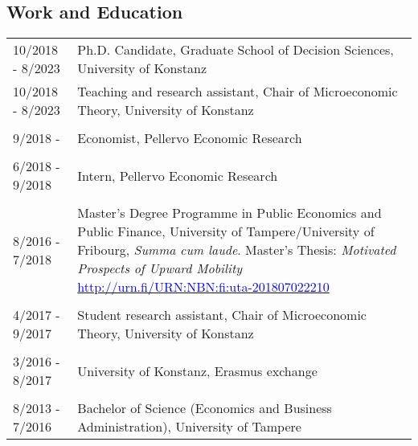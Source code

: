 \documentclass[16pt]{article}
\begin{document}
\subsection*{Work and Education}
\begin{tabular}{@{}p{1.5in}p{5in}}
10/2018 - 8/2023   & Ph.D. Candidate, Graduate School of Decision Sciences, University of Konstanz \\
10/2018 - 8/2023  & Teaching and research assistant, Chair of Microeconomic Theory,  University of Konstanz \\

                                                 
\\
9/2018 -            & Economist, Pellervo Economic Research\\

\\
6/2018 - 9/2018 & Intern, Pellervo Economic Research\\

\\
8/2016 - 7/2018 & Master's Degree Programme in Public Economics and Public Finance, University of Tampere/University of Fribourg, \textit{Summa cum laude}. Master's Thesis: \textit{Motivated Prospects of Upward Mobility} \href{http://urn.fi/URN:NBN:fi:uta-201807022210}{\textcolor{blue}{http://urn.fi/URN:NBN:fi:uta-201807022210}}\\

\\
4/2017 - 9/2017 & Student research assistant, Chair of Microeconomic Theory,  University of Konstanz\\

\\
3/2016 - 8/2017 & University of Konstanz, Erasmus exchange \\
\\
8/2013 - 7/2016 & Bachelor of Science (Economics and Business Administration), University of Tampere\\
                           
\end{tabular}
%
\end{document}
